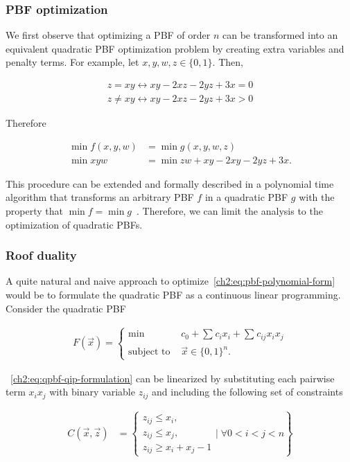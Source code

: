 \subsubsection{PBF optimization}
 We first observe that optimizing a PBF of order $n$ can be transformed into an equivalent quadratic PBF optimization problem by creating extra variables and penalty terms. For example, let $x,y,w,z \in \{0,1\}$. Then,
 
 \begin{align*}
 	z=xy \leftrightarrow  xy -2xz-2yz+3x=0 \\
 	z \neq xy \leftrightarrow  xy -2xz-2yz+3x>0
 \end{align*}
 
 Therefore
 
\begin{align*}
	\min f(x,y,w) &= \min g(x,y,w,z) \\
    \min xyw &= \min zw + xy -2xy -2yz +3x .
\end{align*} 

  This procedure can be extended and formally described in a polynomial time algorithm that transforms an arbitrary PBF $f$ in a quadratic PBF $g$ with the property that $\min f = \min g$~\cite{boros02pseudo}. Therefore, we can limit the analysis to the optimization of quadratic PBFs.
  
\subsubsection{Roof duality}

A quite natural and naive approach to optimize~\cref{ch2:eq:pbf-polynomial-form} would be to formulate the quadratic PBF as a continuous linear programming. Consider the quadratic PBF

\begin{align}
	F(\vec{x}) = \left\{ \begin{array}{rl}
		\min &c_0 + \sum_{}{c_ix_i} + \sum_{}{c_{ij}x_ix_j} \\
	\text{subject to }& \vec{x} \in \{0,1\}^n.
	\end{array}\right.
	\label{ch2:eq:qpbf-qip-formulation}
\end{align}

~\cref{ch2:eq:qpbf-qip-formulation} can be linearized by substituting each pairwise term $x_ix_j$ with binary variable $z_{ij}$ and including the following set of constraints 

\begin{align*}
	C(\vec{x},\vec{z}) &= \left\{  \begin{array}{l}
	z_{ij} \leq x_i, \\
	z_{ij} \leq x_j, \\
	z_{ij} \geq x_i + x_j - 1 
	\end{array} \Bigg|\; \forall 0<i<j<n \right\}
\end{align*}

